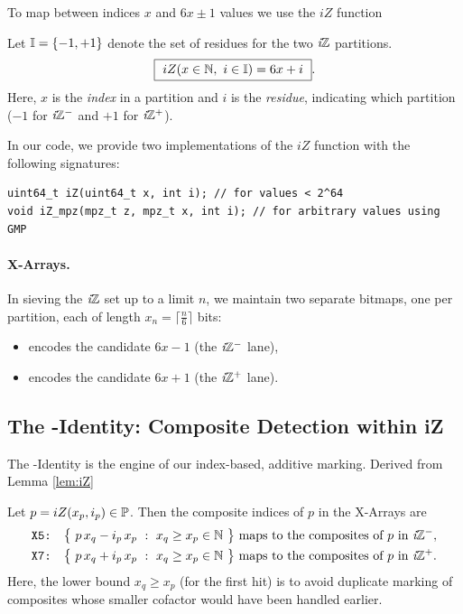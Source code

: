 \documentclass{article}
\begin{document}
To map between indices $x$ and $6x\pm1$ values we use the $iZ$ function
\begin{definition}
    Let $\mathbb{I} = \{-1,+1\}$ denote the set of residues for the two $\textit{i}\mathbb{Z}$ partitions.
    \[
    \boxed{\ iZ(x \in\mathbb{N},\ i \in\mathbb{I})=6x+i\ }.
    \]
    Here, $x$ is the \emph{index} in a partition and $i$ is the \emph{residue}, indicating which partition ($-1$ for $\textit{i}\mathbb{Z}^-$ and $+1$ for $\textit{i}\mathbb{Z}^+$).
\end{definition}

In our code, we provide two implementations of the $iZ$ function with the following signatures:
\begin{lstlisting}[style=C, caption={File: utils.h}]
uint64_t iZ(uint64_t x, int i); // for values < 2^64
void iZ_mpz(mpz_t z, mpz_t x, int i); // for arbitrary values using GMP
\end{lstlisting}

\paragraph{X-Arrays.}
In sieving the $\textit{i}\mathbb{Z}$ set up to a limit $n$, we maintain two separate bitmaps, one per partition, each of length $ x_n = \lceil \frac{n}{6} \rceil$ bits:
\begin{itemize}
    \item {} encodes the candidate $6x-1$ (the $\textit{i}\mathbb{Z}^-$ lane),
    \item {} encodes the candidate $6x+1$ (the $\textit{i}\mathbb{Z}^+$ lane).
\end{itemize}

\subsection{The \Xp-Identity: Composite Detection within iZ} \label{sec:xp_id}
The \Xp-Identity is the engine of our index-based, additive marking. Derived from Lemma \ref{lem:iZ}
\begin{definition}[\Xp-Identity]
    Let $p=iZ(x_p,i_p)\in\mathbb{P}$. Then the composite indices of $p$ in the X-Arrays are
    \[
    \begin{aligned}
        \texttt{X5:}&\quad \big\{\ p\,x_q - i_p\,x_p\ :\ x_q\ge x_p \in\mathbb{N}\ \big\} \text{ maps to the composites of $p$ in $\textit{i}\mathbb{Z}^-$},\\
        \texttt{X7:}&\quad \big\{\ p\,x_q + i_p\,x_p\ :\ x_q\ge x_p \in\mathbb{N}\ \big\} \text{ maps to the composites of $p$ in $\textit{i}\mathbb{Z}^+$}.
    \end{aligned}
    \]
    Here, the lower bound $x_q\ge x_p$ (for the first hit) is to avoid duplicate marking of composites whose smaller cofactor would have been handled earlier.
\end{definition}
\end{document}
